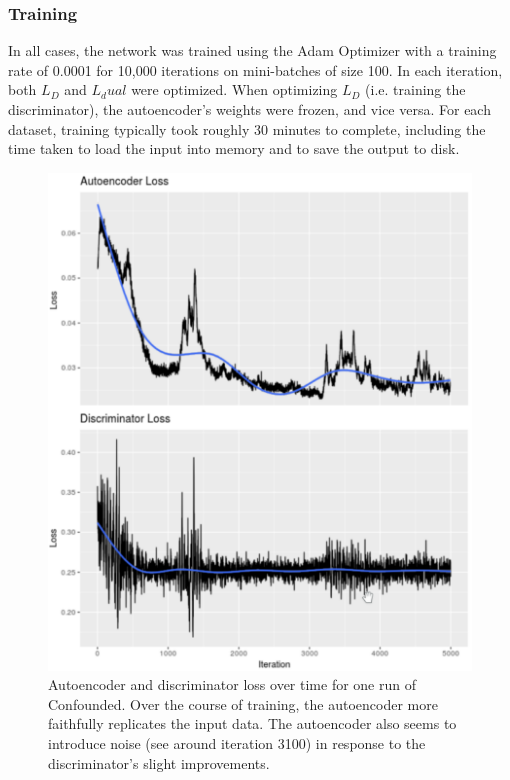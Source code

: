 \documentclass[notitlepage]{article}
\begin{document}
\subsubsection{Training}

In all cases, the network was trained using the Adam Optimizer \cite{kingma_adam_2014} with a training rate of 0.0001 for 10,000 iterations on mini-batches of size 100.
In each iteration, both $L_D$ and $L_dual$ were optimized.
When optimizing $L_D$ (i.e. training the discriminator), the autoencoder's weights were frozen, and vice versa.
For each dataset, training typically took roughly 30 minutes to complete, including the time taken to load the input into memory and to save the output to disk.

\begin{figure}
	\centering
	\includegraphics[width=\columnwidth]{figures/rough/training_loss}
	\caption{Autoencoder and discriminator loss over time for one run of Confounded.
	Over the course of training, the autoencoder more faithfully replicates the input data.
	The autoencoder also seems to introduce noise (see around iteration 3100) in response to the discriminator's slight improvements.}
	\label{fig:training_loss}
\end{figure}
\end{document}
